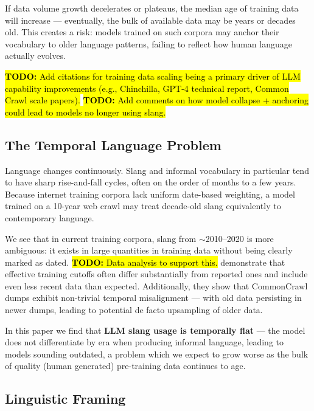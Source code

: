 \documentclass[11pt]{article}
\newcommand{\todo}[1]{\hl{\textbf{TODO:} #1}}
\begin{document}
If data volume growth decelerates or plateaus, the median age
  of training data will increase --- eventually, the bulk of available
  data may be years or decades old. This creates a risk: models trained on such corpora may anchor
  their vocabulary to older language patterns, failing to reflect how
  human language actually evolves.

\todo{Add citations for training data scaling being a primary driver of
LLM capability improvements (e.g., Chinchilla, GPT-4 technical report,
Common Crawl scale papers).}
\todo{Add comments on how model collapse + anchoring could lead to models no longer using slang.}

\subsection{The Temporal Language Problem}

Language changes continuously. Slang and informal vocabulary in
particular tend to have sharp rise-and-fall cycles, often on the order
of months to a few years. Because internet training corpora lack uniform
date-based weighting, a model trained on a 10-year web crawl may treat
decade-old slang equivalently to contemporary language.


  We see that in current training corpora, slang from $\sim$2010--2020 is more ambiguous: it exists in large
  quantities in training data without being clearly marked as dated. \todo{Data analysis to support this.}
  \citet{cheng2024dated} demonstrate that effective training cutoffs
  often differ substantially from reported ones and include even less recent data than expected. Additionally, they show that CommonCrawl
  dumps exhibit non-trivial temporal misalignment --- with old data
  persisting in newer dumps, leading to potential de facto upsampling of older data.

    In this paper we find that \textbf{LLM slang usage is temporally flat} ---
  the model does not differentiate by era when producing informal language, leading to models sounding outdated, a problem which we expect to grow worse as the bulk of quality (human generated) pre-training data continues to age.

\subsection{Linguistic Framing}
\end{document}
